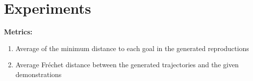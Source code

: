 \section{Experiments}\label{sec:experiments}

\textbf{Metrics:}
\begin{enumerate}[noitemsep, topsep=0pt, leftmargin=2em]
    \item Average of the minimum distance to each goal in the generated reproductions
    \item Average Fr\'{e}chet distance between the generated trajectories and the given demonstrations
\end{enumerate}
